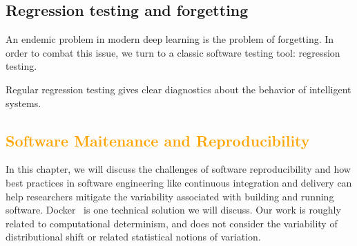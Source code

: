 \documentclass[12pt,initial,twoside,maitrise]{dms}
\newcommand{\mediumrare}[1]{\textcolor{orange}{#1}}
\numberwithin{equation}{section}
\numberwithin{table}{chapter}
\numberwithin{figure}{chapter}
\begin{document}
%
%
%
%
%
%
%
%
%
%

\section{Regression testing and forgetting}

An endemic problem in modern deep learning is the problem of forgetting. In order to combat this issue, we turn to a classic software testing tool: regression testing.

Regular regression testing gives clear diagnostics about the behavior of intelligent systems.

\mediumrare{\chapter{Software Maitenance and Reproducibility}\label{ch:software-reproducibility}}

In this chapter, we will discuss the challenges of software reproducibility and how best practices in software engineering like continuous integration and delivery can help researchers mitigate the variability associated with building and running software. Docker~\cite{merkel2014docker} is one technical solution we will discuss. Our work is roughly related to computational determinism, and does not consider the variability of distributional shift or related statistical notions of variation.
\end{document}
